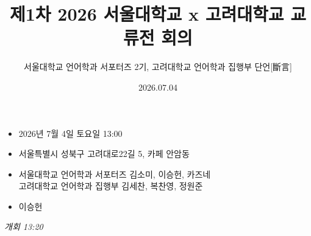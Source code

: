 \documentclass{oblivoir}
\title{\textbf{제1차 2026 서울대학교 x 고려대학교 교류전 회의}}
\author{서울대학교 언어학과 서포터즈 2기, 고려대학교 언어학과 집행부 단언[斷言]}
\date{2026.07.04}
\begin{document}
\maketitle

\begin{itemize}
    \item [\textbf{일시}] 2026년 7월 4일 토요일 13:00
    \item [\textbf{장소}] 서울특별시 성북구 고려대로22길 5, 카페 안암동
    \item [\textbf{참석자}] 서울대학교 언어학과 서포터즈 김소미, 이승헌, 카즈네 \\고려대학교 언어학과 집행부 김세찬, 복찬영, 정원준
    \item [\textbf{속기자}] 이승헌
\end{itemize}

\textit{개회 13:20}
\end{document}
